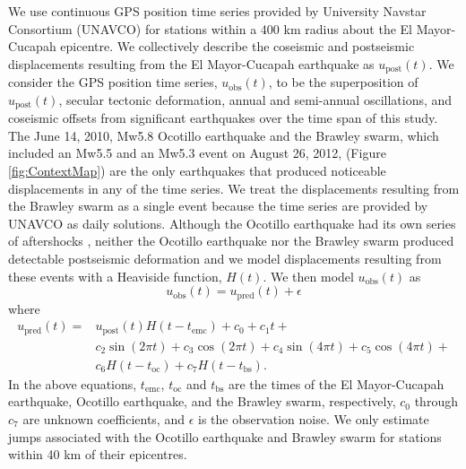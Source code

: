 \documentclass[1p]{elsarticle}
\begin{document}
We use continuous GPS position time series provided by University Navstar Consortium (UNAVCO) for stations within a 400 km radius about the El Mayor-Cucapah epicentre. We collectively describe the coseismic and postseismic displacements resulting from the El Mayor-Cucapah earthquake as $u_\mathrm{post}(t)$.  We consider the GPS position time series, $u_\mathrm{obs}(t)$, to be the superposition of $u_\mathrm{post}(t)$, secular tectonic deformation, annual and semi-annual oscillations, and coseismic offsets from significant earthquakes over the time span of this study.  The June 14, 2010, Mw5.8 Ocotillo earthquake and the Brawley swarm, which included an Mw5.5 and an Mw5.3 event on August 26, 2012, (Figure \ref{fig:ContextMap}) are the only earthquakes that produced noticeable displacements in any of the time series.  We treat the displacements resulting from the Brawley swarm as a single event because the time series are provided by UNAVCO as daily solutions. Although the Ocotillo earthquake had its own series of aftershocks \citep{Hauksson2011}, neither the Ocotillo earthquake nor the Brawley swarm produced detectable postseismic deformation and we model displacements resulting from these events with a Heaviside function, $H(t)$.  We then model $u_\mathrm{obs}(t)$ as 
\begin{equation}
  u_\mathrm{obs}(t) = u_\mathrm{pred}(t) + \epsilon
\end{equation}
where
\begin{equation}\label{TimeSeriesModel}
  \begin{split}  
    u_\mathrm{pred}(t) = &u_\mathrm{post}(t)H(t-t_\mathrm{emc}) + c_0 + c_1t + \\
                         &c_2\sin(2\pi t) + c_3\cos(2\pi t) + c_4\sin(4\pi t) + c_5\cos(4\pi t) + \\
                         &c_6H(t-t_\mathrm{oc}) + c_7H(t-t_\mathrm{bs}).
  \end{split}
\end{equation}
In the above equations, $t_\mathrm{emc}$, $t_\mathrm{oc}$ and $t_\mathrm{bs}$ are the times of the El Mayor-Cucapah earthquake, Ocotillo earthquake, and the Brawley swarm, respectively, $c_0$ through $c_7$ are unknown coefficients, and $\epsilon$ is the observation noise. We only estimate jumps associated with the Ocotillo earthquake and Brawley swarm for stations within 40 km of their epicentres. 
\end{document}
